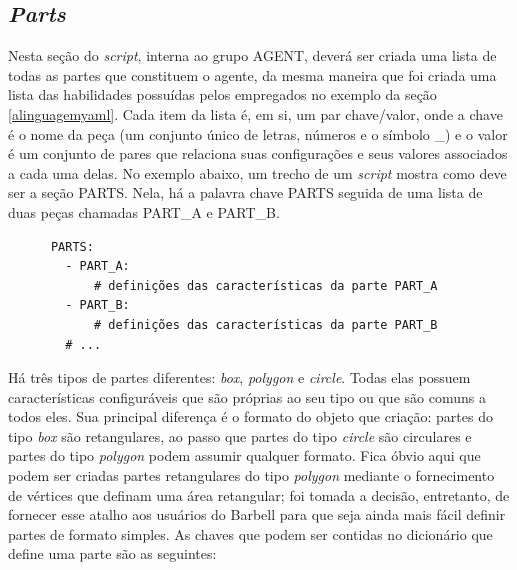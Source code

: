 \documentclass[cic,tc]{iiufrgs}
\begin{document}
    \subsection{\textit{Parts}}
    \label{parts}
      Nesta seção do \textit{script}, interna ao grupo AGENT, deverá ser criada uma lista de todas as partes que constituem o agente, da mesma maneira que foi criada
      uma lista das habilidades possuídas pelos empregados no exemplo da seção \ref{alinguagemyaml}. Cada item da lista é, em si, um par chave/valor, onde a chave é
      o nome da peça (um conjunto único de letras, números e o símbolo \_) e o valor é um conjunto de pares que relaciona suas configurações e seus valores associados
      a cada uma delas. No exemplo abaixo, um trecho de um \textit{script} mostra como deve ser a seção PARTS. Nela, há a palavra chave PARTS seguida de uma lista de
      duas peças chamadas PART\_A e PART\_B.
    
      \begin{verbatim}
      PARTS:
        - PART_A:
            # definições das características da parte PART_A
        - PART_B:
            # definições das características da parte PART_B
        # ...
      \end{verbatim}
    
    Há três tipos de partes diferentes: \textit{box}, \textit{polygon} e \textit{circle}. Todas elas possuem características configuráveis que são próprias ao seu tipo
    ou que são comuns a todos eles. Sua principal diferença é o formato do objeto que criação: partes do tipo \textit{box} são retangulares, ao passo que partes do tipo
    \textit{circle} são circulares e partes do tipo \textit{polygon} podem assumir qualquer formato. Fica óbvio aqui que podem ser criadas partes retangulares do tipo
    \textit{polygon} mediante o fornecimento de vértices que definam uma área retangular; foi tomada a decisão, entretanto, de fornecer esse atalho aos usuários do Barbell
    para que seja ainda mais fácil definir partes de formato simples. As chaves que podem ser contidas no dicionário que define uma parte são as seguintes:
    
\end{document}
